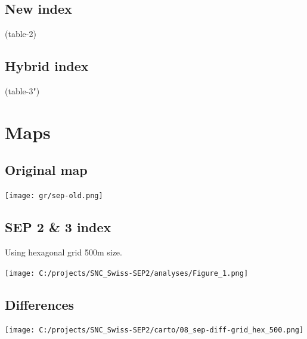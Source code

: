 \documentclass[a4paper, notitlepage, fleqn]{article} %
\begin{document}
\newpage
\subsection{New index}
\begin{landscape}
\begin{footnotesize}
(table-2)
\end{footnotesize}
\end{landscape}

\newpage
\subsection{Hybrid index}
\begin{landscape}
\begin{footnotesize}
(table-3")
\end{footnotesize}
\end{landscape}

\newpage
\section{Maps}
\subsection{Original map}

\begin{center}
\texttt{[image: gr/sep-old.png]} 
\end{center}

\newpage 
\subsection{SEP 2 \& 3 index}

Using hexagonal grid 500m size.  

\begin{center}
\texttt{[image: C:/projects/SNC\_Swiss-SEP2/analyses/Figure\_1.png]} 
\end{center}

\newpage
\subsection{Differences}

\begin{center}
\texttt{[image: C:/projects/SNC\_Swiss-SEP2/carto/08\_sep-diff-grid\_hex\_500.png]} 
\end{center}
\end{document}
